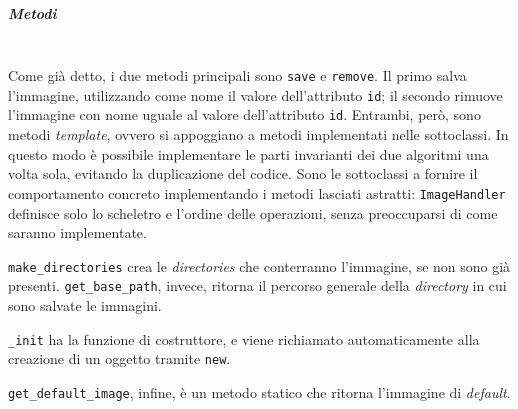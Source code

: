 \subparagraph{Metodi} \mbox{} \\
Come già detto, i due metodi principali sono \texttt{save} e \texttt{remove}. Il primo salva l'immagine, utilizzando come nome il valore dell'attributo \texttt{id}; il secondo rimuove l'immagine con nome uguale al valore dell'attributo \texttt{id}. Entrambi, però, sono metodi \textit{template}, ovvero si appoggiano a metodi implementati nelle sottoclassi. In questo modo è possibile implementare le parti invarianti dei due algoritmi una volta sola, evitando la duplicazione del codice. Sono le sottoclassi a fornire il comportamento concreto implementando i metodi lasciati astratti: \texttt{ImageHandler} definisce solo lo scheletro e l'ordine delle operazioni, senza preoccuparsi di come saranno implementate.

\texttt{make\_directories} crea le \textit{directories} che conterranno l'immagine, se non sono già presenti. \texttt{get\_base\_path}, invece, ritorna il percorso generale della \textit{directory} in cui sono salvate le immagini. 

\texttt{\_init} ha la funzione di costruttore, e viene richiamato automaticamente alla creazione di un oggetto tramite \texttt{new}.

\texttt{get\_default\_image}, infine, è un metodo statico che ritorna l'immagine di \textit{default}.

\newpage
